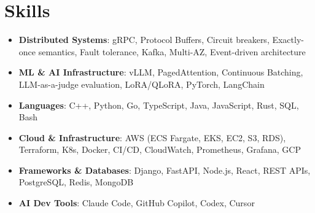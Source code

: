 \documentclass[letterpaper,11pt]{article}
\newcommand{\resumeSubHeadingListStart}{\begin{itemize}[leftmargin=0.15in, label={}]}
\newcommand{\resumeSubHeadingListEnd}{\end{itemize}}
\newcommand{\resumeSkillHeading}[2]{%
  \item\small{\textbf{#1}: #2 \vspace{-9pt}}%
}
\begin{document}
\section{Skills}
  \resumeSubHeadingListStart
    \resumeSkillHeading{Distributed Systems}{gRPC, Protocol Buffers, Circuit breakers, Exactly-once semantics, Fault tolerance, Kafka, Multi-AZ, Event-driven architecture}
    \resumeSkillHeading{ML \& AI Infrastructure}{vLLM, PagedAttention, Continuous Batching, LLM-as-a-judge evaluation, LoRA/QLoRA, PyTorch, LangChain}
    \resumeSkillHeading{Languages}{C++, Python, Go, TypeScript, Java, JavaScript, Rust, SQL, Bash}
    \resumeSkillHeading{Cloud \& Infrastructure}{AWS (ECS Fargate, EKS, EC2, S3, RDS), Terraform, K8s, Docker, CI/CD, CloudWatch, Prometheus, Grafana, GCP}
    \resumeSkillHeading{Frameworks \& Databases}{Django, FastAPI, Node.js, React, REST APIs, PostgreSQL, Redis, MongoDB}
    \resumeSkillHeading{AI Dev Tools}{Claude Code, GitHub Copilot, Codex, Cursor}
  \resumeSubHeadingListEnd
\end{document}
